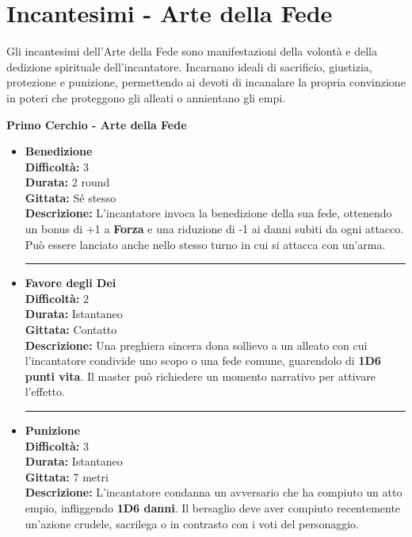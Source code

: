 \documentclass[../manuale_main.tex]{subfiles}
\begin{document}
\section{Incantesimi - Arte della Fede}

Gli incantesimi dell'Arte della Fede sono manifestazioni della volontà e della dedizione spirituale dell'incantatore. Incarnano ideali di sacrificio, giustizia, protezione e punizione, permettendo ai devoti di incanalare la propria convinzione in poteri che proteggono gli alleati o annientano gli empi.

\vspace{0.4cm}
{\zarafirtitlefont\Large\bfseries Primo Cerchio - Arte della Fede}

\begin{itemize}


\item \textbf{Benedizione} \\
\textbf{Difficoltà:} 3 \\
\textbf{Durata:} 2 round \\
\textbf{Gittata:} Sé stesso \\
\textbf{Descrizione:} L’incantatore invoca la benedizione della sua fede, ottenendo un bonus di +1 a \textbf{Forza} e una riduzione di -1 ai danni subiti da ogni attacco. Può essere lanciato anche nello stesso turno in cui si attacca con un'arma.

\vspace{0.5cm}\rule{\textwidth}{0.4pt}\vspace{1cm}

\item \textbf{Favore degli Dei} \\
\textbf{Difficoltà:} 2 \\
\textbf{Durata:} Istantaneo \\
\textbf{Gittata:} Contatto \\
\textbf{Descrizione:} Una preghiera sincera dona sollievo a un alleato con cui l’incantatore condivide uno scopo o una fede comune, guarendolo di \textbf{1D6 punti vita}. Il master può richiedere un momento narrativo per attivare l’effetto.

\vspace{0.5cm}\rule{\textwidth}{0.4pt}\vspace{1cm}

\clearpage
\item \textbf{Punizione} \\
\textbf{Difficoltà:} 3 \\
\textbf{Durata:} Istantaneo \\
\textbf{Gittata:} 7 metri \\
\textbf{Descrizione:} L’incantatore condanna un avversario che ha compiuto un atto empio, infliggendo \textbf{1D6 danni}. Il bersaglio deve aver compiuto recentemente un’azione crudele, sacrilega o in contrasto con i voti del personaggio.


\end{itemize}
\end{document}
